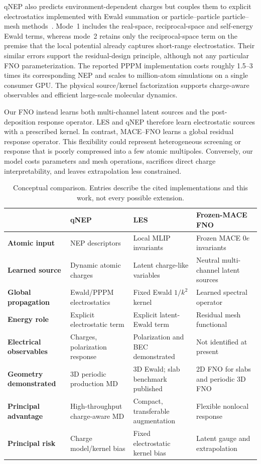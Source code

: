 \documentclass[11pt]{article}
\newcommand{\macefno}{\textsc{MACE--FNO}}
\begin{document}
qNEP also predicts environment-dependent charges but couples them to explicit
electrostatics implemented with Ewald summation or particle--particle
particle--mesh methods~\citep{fan2026qnep}. Mode~1 includes the real-space,
reciprocal-space and self-energy Ewald terms, whereas mode~2 retains only the
reciprocal-space term on the premise that the local potential already captures
short-range electrostatics. Their similar errors support the residual-design
principle, although not any particular FNO parameterization. The reported
PPPM implementation costs roughly 1.5--3 times its corresponding NEP and
scales to million-atom simulations on a single consumer GPU. The physical
source/kernel
factorization supports charge-aware observables and efficient large-scale
molecular dynamics.

Our FNO instead learns both multi-channel latent sources and the
post-deposition response operator. LES and qNEP therefore learn electrostatic
sources with a prescribed kernel. In contrast, \macefno{} learns a global
residual response operator. This flexibility could represent heterogeneous
screening or response that is
poorly compressed into a few atomic multipoles. Conversely, our model costs
parameters and mesh operations, sacrifices direct charge interpretability,
and leaves extrapolation less constrained.

\begin{table}[t]
\centering
\caption{Conceptual comparison. Entries describe the cited implementations
and this work, not every possible extension.}
\label{tab:method-comparison}
\small
\begin{tabularx}{\textwidth}{>{\bfseries}lXXX}
\toprule
 & qNEP & LES & Frozen-MACE FNO\\
\midrule
Atomic input & NEP descriptors & Local MLIP invariants &
Frozen MACE \(0e\) invariants\\
Learned source & Dynamic atomic charges & Latent charge-like variables &
Neutral multi-channel latent sources\\
Global propagation & Ewald/PPPM electrostatics & Fixed Ewald \(1/k^2\) kernel &
Learned spectral operator\\
Energy role & Explicit electrostatic term & Explicit latent-Ewald term &
Residual mesh functional\\
Electrical observables & Charges, polarization response &
Polarization and BEC demonstrated & Not identified at present\\
Geometry demonstrated & 3D periodic production MD &
3D Ewald; slab benchmark published & 2D FNO for slabs and periodic 3D FNO\\
Principal advantage & High-throughput charge-aware MD &
Compact, transferable augmentation & Flexible nonlocal response\\
Principal risk & Charge model/kernel bias & Fixed electrostatic kernel bias &
Latent gauge and extrapolation\\
\bottomrule
\end{tabularx}
\end{table}
\end{document}
